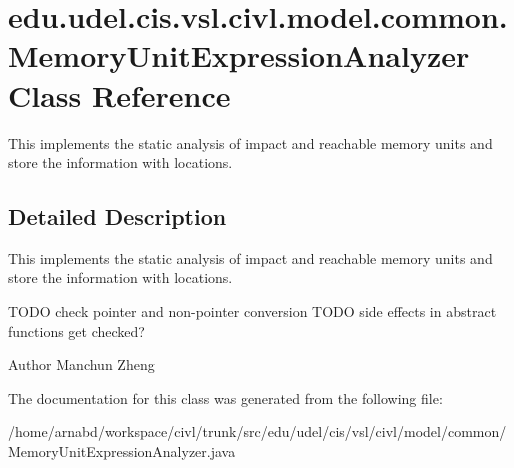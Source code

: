 \hypertarget{classedu_1_1udel_1_1cis_1_1vsl_1_1civl_1_1model_1_1common_1_1MemoryUnitExpressionAnalyzer}{}\section{edu.\+udel.\+cis.\+vsl.\+civl.\+model.\+common.\+Memory\+Unit\+Expression\+Analyzer Class Reference}
\label{classedu_1_1udel_1_1cis_1_1vsl_1_1civl_1_1model_1_1common_1_1MemoryUnitExpressionAnalyzer}


This implements the static analysis of impact and reachable memory units and store the information with locations.  




\subsection{Detailed Description}
This implements the static analysis of impact and reachable memory units and store the information with locations. 

T\+O\+D\+O check pointer and non-\/pointer conversion T\+O\+D\+O side effects in abstract functions get checked?

\begin{DoxyAuthor}{Author}
Manchun Zheng 
\end{DoxyAuthor}


The documentation for this class was generated from the following file\+:\begin{DoxyCompactItemize}
\item 
/home/arnabd/workspace/civl/trunk/src/edu/udel/cis/vsl/civl/model/common/Memory\+Unit\+Expression\+Analyzer.\+java\end{DoxyCompactItemize}
